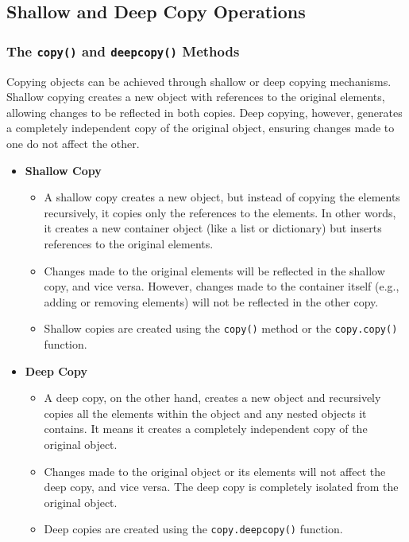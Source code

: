 \newpage
\subsection{Shallow and Deep Copy Operations}

\subsubsection{The \texttt{copy()} and \texttt{deepcopy()} Methods}
Copying objects can be achieved through shallow or deep copying mechanisms. Shallow copying creates a new object with references to the original elements, allowing changes to be reflected in both copies. Deep copying, however, generates a completely independent copy of the original object, ensuring changes made to one do not affect the other.

\begin{itemize}
    \item \textbf{Shallow Copy}
    \begin{itemize}
        \item A shallow copy creates a new object, but instead of copying the elements recursively, it copies only the references to the elements. In other words, it creates a new container object (like a list or dictionary) but inserts references to the original elements.
        \item Changes made to the original elements will be reflected in the shallow copy, and vice versa. However, changes made to the container itself (e.g., adding or removing elements) will not be reflected in the other copy.
        \item Shallow copies are created using the \texttt{copy()} method or the \texttt{copy.copy()} function.
    \end{itemize}
    
    \item \textbf{Deep Copy}
    \begin{itemize}
        \item A deep copy, on the other hand, creates a new object and recursively copies all the elements within the object and any nested objects it contains. It means it creates a completely independent copy of the original object.
        \item Changes made to the original object or its elements will not affect the deep copy, and vice versa. The deep copy is completely isolated from the original object.
        \item Deep copies are created using the \texttt{copy.deepcopy()} function.
    \end{itemize}
\end{itemize}

